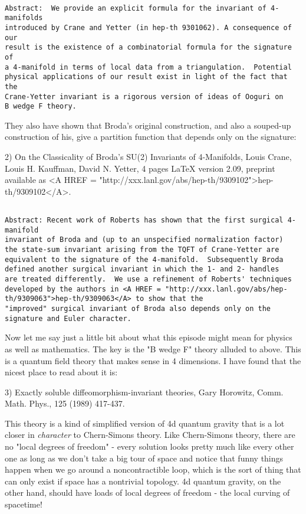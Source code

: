 \begin{verbatim}

Abstract:  We provide an explicit formula for the invariant of 4-manifolds
introduced by Crane and Yetter (in hep-th 9301062). A consequence of our
result is the existence of a combinatorial formula for the signature of
a 4-manifold in terms of local data from a triangulation.  Potential
physical applications of our result exist in light of the fact that the
Crane-Yetter invariant is a rigorous version of ideas of Ooguri on
B wedge F theory.
\end{verbatim}
    

They also have shown that Broda's original construction, and also a
souped-up construction of his, give a partition function that depends
only on the signature:

2)  On the Classicality of Broda's SU(2) Invariants of 4-Manifolds,
Louis Crane, Louis H. Kauffman, David N. Yetter, 4 pages LaTeX version
2.09, preprint available as <A HREF = "http://xxx.lanl.gov/abs/hep-th/9309102">hep-th/9309102</A>.


\begin{verbatim}

Abstract: Recent work of Roberts has shown that the first surgical 4-manifold
invariant of Broda and (up to an unspecified normalization factor)
the state-sum invariant arising from the TQFT of Crane-Yetter are
equivalent to the signature of the 4-manifold.  Subsequently Broda
defined another surgical invariant in which the 1- and 2- handles
are treated differently.  We use a refinement of Roberts' techniques
developed by the authors in <A HREF = "http://xxx.lanl.gov/abs/hep-th/9309063">hep-th/9309063</A> to show that the
"improved" surgical invariant of Broda also depends only on the
signature and Euler character.
\end{verbatim}
    

Now let me say just a little bit about what this episode might mean for
physics as well as mathematics.  The key is the "B wedge F" theory
alluded to above.   This is a quantum field theory that makes sense in 4
dimensions.  I have found that the nicest place to read about it is:

3)  Exactly soluble diffeomorphism-invariant theories, Gary Horowitz,
Comm. Math. Phys., 125 (1989) 417-437.

This theory is a kind of simplified version of 4d quantum gravity that
is a lot closer in \emph{character} to Chern-Simons theory.  Like
Chern-Simons theory, there are no "local degrees of freedom" - every
solution looks pretty much like every other one as long as we don't take
a big tour of space and notice that funny things happen when we go
around a noncontractible loop, which is the sort of thing that can only
exist if space has a nontrivial topology.  4d quantum gravity, on the
other hand, should have loads of local degrees of freedom - the local
curving of spacetime!  

